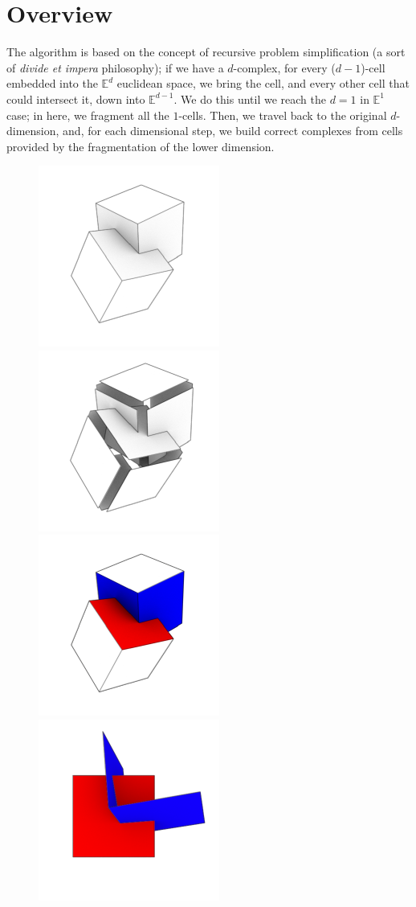\section{Overview}
\label{sec:spatial_arrangement_overview}
The algorithm is based on the concept of recursive problem simplification 
(a sort of \textit{divide et impera} philosophy); if we have a $d$-complex, for every
($d-1$)-cell embedded into the $\mathbb{E}^d$ euclidean space, we bring the cell,
and every other cell that could intersect it, down into $\mathbb{E}^{d-1}$. We do this until
we reach the $d=1$ in $\mathbb{E}^1$ case; in here, we fragment all the $1$-cells.
Then, we travel back to the original $d$-dimension, and, for each
dimensional step, we build correct complexes from cells provided by the 
fragmentation of the lower dimension. 

\begin{figure}[h]
    \begin{center}
        \includegraphics[width=.25\textwidth]{./img/ch1-1.pdf}%
        \includegraphics[width=.25\textwidth]{./img/ch1-2.pdf}%
        \includegraphics[width=.25\textwidth]{./img/ch1-3.pdf}%
        \includegraphics[width=.25\textwidth]{./img/ch1-4.pdf}%


\end{center}
\end{figure}
